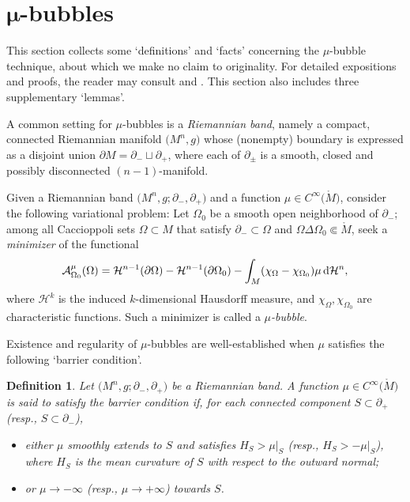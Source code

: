 \documentclass[10pt,a4paper]{amsart}
\numberwithin{equation}{section}
\newtheorem{Definition}[Theorem]{Definition}
\def\refOmega{\Omega_0}
\def\Hcal{\mathcal{H}}
\def\Acal{\mathcal{A}}
\begin{document}
\appendix

\section[mu-bubbles]{$\boldsymbol{\mu}$-bubbles}\label{mubbSec}

This section collects some `definitions' and `facts' concerning
the $\mu$-bubble technique, about which we make no claim to originality.
For detailed expositions and proofs,
the reader may consult \cite{CRZ2022,CL20,ZZ20, Zhu21warp} and \cite[Section~5]{Gr2021}.
This section also includes three supplementary `lemmas'.

A common setting for $\mu$-bubbles is a \emph{Riemannian band}, namely
a compact, connected Riemannian manifold $\big(M^n,g\big)$ whose (nonempty) boundary
is expressed as a disjoint union $\partial M = \partial_-\sqcup \partial_+$,
where each of $\partial_\pm$ is a smooth, closed and possibly disconnected
$(n-1)$-manifold.

Given a Riemannian band $\big(M^n,g;\partial_-,\partial_+\big)$
and a function $\mu\in C^\infty\big(\mathring{M}\big)$,
consider the following variational problem: Let $\Omega_0$ be a smooth open neighborhood of $\partial_-$; among all Caccioppoli sets
$\Omega\subset M$ that satisfy $\partial_-\subset \Omega$ and $\Omega\Delta\Omega_0 \Subset \mathring{M}$, seek a \emph{minimizer} of the functional
\begin{equation*}%
	\Acal_{\refOmega}^{\mu}(\Omega)=\Hcal^{n-1}(\partial \Omega)-\Hcal^{n-1}(\partial\refOmega)-\int_{M}(\chi_{\Omega} - \chi_{\refOmega})\mu\, {\rm d}\Hcal^n,
\end{equation*}
where $\Hcal^k$ is the induced $k$-dimensional Hausdorff measure, and
$\chi_\Omega, \chi_{\refOmega}$ are characteristic functions.
Such a minimizer is called a \emph{$\mu$-bubble}.

Existence and regularity of $\mu$-bubbles are well-established when $\mu$
satisfies the following `barrier condition'.
\begin{Definition}\label{barrierdef}
	Let $\big(M^n,g;\partial_-,\partial_+\big)$ be a Riemannian band.
	A function $\mu\in C^\infty\big(\mathring{M}\big)$ is said to satisfy the
	\emph{barrier condition} if, for each connected component $S\subset\partial_+$ (resp., $S\subset \partial_-$),
	\begin{itemize}\itemsep=0pt
	\item either $\mu$ smoothly extends to $S$ and satisfies
					$H_S > \mu|_S$	(resp., $H_S > -\mu|_S$),
	where $H_S$ is
	the mean curvature of $S$ with respect to the outward normal;
	\item or $\mu\to -\infty$  (resp., $\mu\to +\infty$) towards $S$.
	\end{itemize}
\end{Definition}
\end{document}
